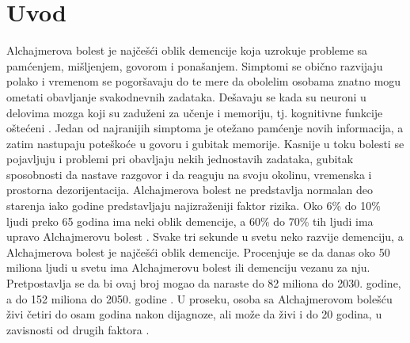\documentclass[12pt,oneside]{memoir}
\begin{document}
\frontmatter
\naslovna
\komisija

\tableofcontents{}

\mainmatter


\chapter{Uvod}

Alchajmerova bolest je najčešći oblik demencije koja uzrokuje probleme sa pamćenjem, mišljenjem, govorom i ponašanjem. Simptomi se obično razvijaju polako i vremenom se pogoršavaju do te mere da obolelim osobama znatno mogu ometati obavljanje svakodnevnih zadataka. Dešavaju se kada su neuroni u delovima mozga koji su zaduženi za učenje i memoriju, tj. kognitivne funkcije oštećeni \cite{Alzheimerfactsfigures}. Jedan od najranijih simptoma je otežano pamćenje novih informacija, a zatim nastupaju poteškoće u govoru i gubitak memorije. Kasnije u toku bolesti se pojavljuju i problemi pri obavljaju nekih jednostavih zadataka, gubitak sposobnosti da nastave razgovor i da reaguju na svoju okolinu, vremenska i prostorna dezorijentacija. Alchajmerova bolest ne predstavlja normalan deo starenja iako godine predstavljaju najizraženiji faktor rizika. Oko 6\% do 10\% ljudi preko 65 godina ima neki oblik demencije, a 60\% do 70\% tih ljudi ima upravo Alchajmerovu bolest \cite{actavis}. Svake tri sekunde u svetu neko razvije demenciju, a Alchajmerova bolest je najčešći oblik demencije. Procenjuje se da danas oko 50 miliona ljudi u svetu ima Alchajmerovu bolest ili demenciju vezanu za nju. Pretpostavlja se da bi ovaj broj mogao da naraste do 82 miliona do 2030. godine, a do 152 miliona do 2050. godine \cite{Languageimpairment}. U proseku, osoba sa Alchajmerovom bolešću živi četiri do osam godina nakon dijagnoze, ali može da živi i do 20 godina, u zavisnosti od drugih faktora \cite{seracell}.
\end{document}
